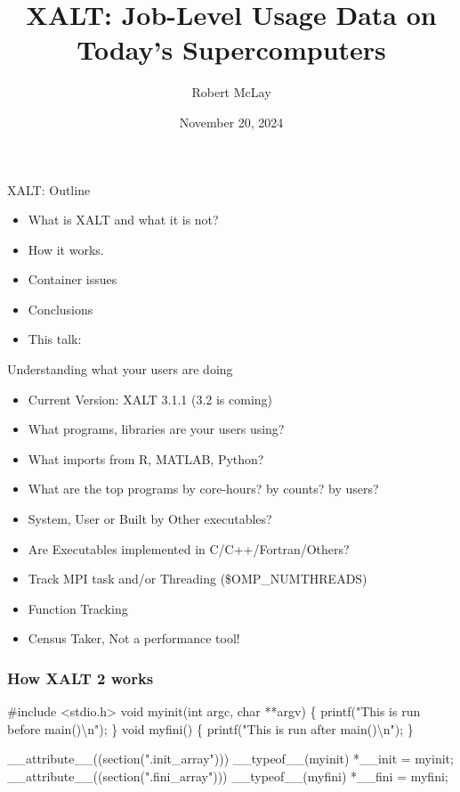 \documentclass{beamer}
\begin{document}
\title[XALT]{XALT: Job-Level Usage Data on Today's Supercomputers}
\author{Robert McLay}
\date{November 20, 2024}

\frame{\titlepage}

\begin{frame}{XALT: Outline}
  \begin{itemize}
    \item What is XALT and what it is not?
    \item How it works.
    \item Container issues
    \item Conclusions
    \item This talk: 
  \end{itemize}
\end{frame}

\begin{frame}{Understanding what your users are doing}
  \begin{itemize}
    \item Current Version: XALT 3.1.1 (3.2 is coming)
    \item What programs, libraries are your users using?
    \item What imports from R, MATLAB, Python?
    \item What are the top programs by core-hours? by counts? by users?
    \item System, User or Built by Other executables?
    \item Are Executables implemented in C/C++/Fortran/Others?
    \item Track MPI task and/or Threading (\$OMP\_NUMTHREADS)
    \item Function Tracking
    \item Census Taker, Not a performance tool!
  \end{itemize}
\end{frame}

\begin{frame}[fragile]
    \frametitle{How XALT 2 works}
 {\tiny
    \begin{semiverbatim}
#include <stdio.h>
void myinit(int argc, char **argv)
\{ printf("This is run before main()\textbackslash{}n"); \}
void myfini()
\{ printf("This is run after main()\textbackslash{}n"); \}

__attribute__((section(".init_array"))) __typeof__(myinit) *__init = myinit;
__attribute__((section(".fini_array"))) __typeof__(myfini) *__fini = myfini;
    \end{semiverbatim}
}
\end{frame}
\end{document}

